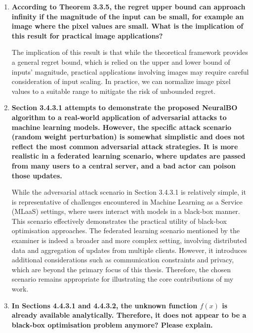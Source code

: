 \documentclass[12pt]{article}
\begin{document}
\begin{enumerate}[leftmargin=0pt, label={\textbf{\arabic*.}}, itemsep=2em]
    \item \textbf{According to Theorem 3.3.5, the regret upper bound can approach infinity if the magnitude of the input can be small, for example an image where the pixel values are small. What is the implication of this result for practical image applications?}
    
    The implication of this result is that while the theoretical framework provides a general regret bound, which is relied on the upper and lower bound of inputs' magnitude, practical applications involving images may require careful consideration of input scaling. In practice, we can normalize image pixel values to a suitable range to mitigate the risk of unbounded regret. 


    \item \textbf{Section 3.4.3.1 attempts to demonstrate the proposed NeuralBO algorithm to a real-world application of adversarial attacks to machine learning models. However, the specific attack scenario (random weight perturbation) is somewhat simplistic and does not reflect the most common adversarial attack strategies. It is more realistic in a federated learning scenario, where updates are passed from many users to a central server, and a bad actor can poison those updates.}

    While the adversarial attack scenario in Section 3.4.3.1 is relatively simple, it is representative of challenges encountered in Machine Learning as a Service (MLaaS) settings, where users interact with models in a black-box manner. This scenario effectively demonstrates the practical utility of black-box optimisation approaches. The federated learning scenario mentioned by the examiner is indeed a broader and more complex setting, involving distributed data and aggregation of updates from multiple clients. However, it introduces additional considerations such as communication constraints and privacy, which are beyond the primary focus of this thesis. Therefore, the chosen scenario remains appropriate for illustrating the core contributions of my work.

    \item \textbf{In Sections 4.4.3.1 and 4.4.3.2, the unknown function $f(x)$ is already available analytically. Therefore, it does not appear to be a black-box optimisation problem anymore? Please explain.}


\end{enumerate}
\end{document}
